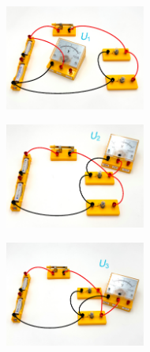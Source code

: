 \begin{figure}[h!]
\centering
    \begin{subfigure}[b]{0.305\textwidth}
    \centering
    \includegraphics[width=4.6cm]{_images/volt_parallel_1.pdf}
    \end{subfigure}
\quad
    \begin{subfigure}[b]{0.305\textwidth}
    \centering
    \includegraphics[width=4.6cm]{_images/volt_parallel_2.pdf}
    \end{subfigure}
\quad
        \begin{subfigure}[b]{0.305\textwidth}
        \centering
        \includegraphics[width=4.6cm]{_images/volt_parallel_3.pdf}
        \end{subfigure}
\end{figure}


